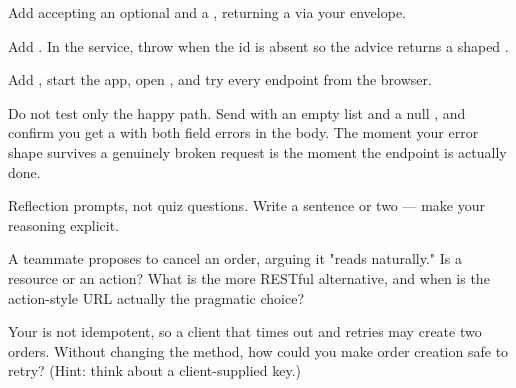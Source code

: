 Add  accepting an optional   and a , returning a  via your envelope.

Add . In the service, throw  when the id is absent so the advice returns a shaped .

Add , start the app, open , and try every endpoint from the browser.

\begin{prodtip}
Do not test only the happy path. Send  with an empty  list and a null , and confirm you get a  with both field errors in the body. The moment your error shape survives a genuinely broken request is the moment the endpoint is actually done.
\end{prodtip}


Reflection prompts, not quiz questions. Write a sentence or two --- make your reasoning explicit.

\begin{thinkbox}
A teammate proposes  to cancel an order, arguing it "reads naturally." Is  a resource or an action? What is the more RESTful alternative, and when is the action-style URL actually the pragmatic choice?
\end{thinkbox}

\begin{thinkbox}
Your  is not idempotent, so a client that times out and retries may create two orders. Without changing the method, how could you make order creation safe to retry? (Hint: think about a client-supplied key.)
\end{thinkbox}

